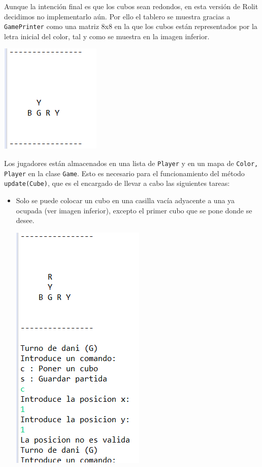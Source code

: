 \documentclass[../DocumentoOficial.tex]{subfiles}
\begin{document}
\begin{sprint}[1]
Aunque la intención final es que los cubos sean redondos, en esta versión de Rolit decidimos no implementarlo aún. Por ello el tablero se muestra gracias a \texttt{GamePrinter} como una matriz 8x8 en la que los cubos están representados por la letra inicial del color, tal y como se muestra en la imagen inferior.
\begin{center}
\includegraphics[scale=0.8]{Board.png}
\end{center}

Los jugadores están almacenados en una lista de \texttt{Player} y en un mapa de \texttt{Color, Player} en la clase \texttt{Game}. Esto es necesario para el funcionamiento del método \texttt{update(Cube)}, que es el encargado de llevar a cabo las siguientes tareas:
\begin{itemize}
\item Solo se puede colocar un cubo en una casilla vacía adyacente a una ya ocupada (ver imagen inferior), excepto el primer cubo que se pone donde se desee.
\begin{center}
\includegraphics[scale=0.8]{pos-no-validaS1.png}
\end{center}


\end{itemize}
\end{sprint}
\end{document}
